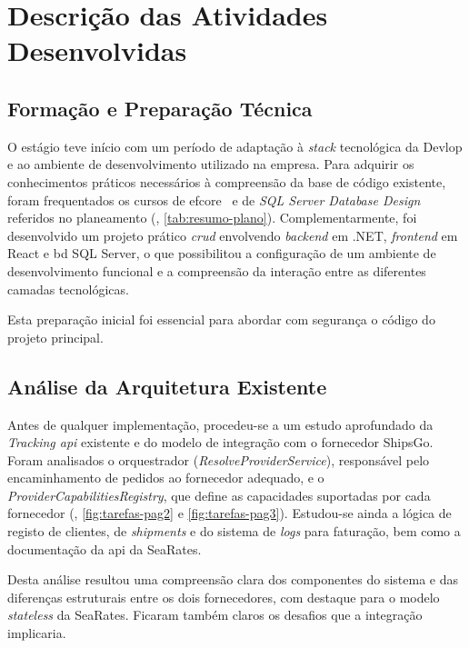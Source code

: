 ﻿%
\chapter{Descrição das Atividades Desenvolvidas}\label{chap:descricao}

\section{Formação e Preparação Técnica}

O estágio teve início com um período de adaptação à \textit{stack} tecnológica da Devlop e ao ambiente de desenvolvimento utilizado na empresa. Para adquirir os conhecimentos práticos necessários à compreensão da base de código existente, foram frequentados os cursos de \gls{efcore}~\cite{efcore-course} e de \textit{SQL Server Database Design}~\cite{sqlserver-course} referidos no planeamento (, \autoref{tab:resumo-plano}). Complementarmente, foi desenvolvido um projeto prático \textit{\gls{crud}} envolvendo \textit{backend} em .NET, \textit{frontend} em React e \gls{bd} SQL Server, o que possibilitou a configuração de um ambiente de desenvolvimento funcional e a compreensão da interação entre as diferentes camadas tecnológicas.

Esta preparação inicial foi essencial para abordar com segurança o código do projeto principal.

\section{Análise da Arquitetura Existente}

Antes de qualquer implementação, procedeu-se a um estudo aprofundado da \textit{Tracking \gls{api}} existente e do modelo de integração com o fornecedor ShipsGo. Foram analisados o orquestrador (\textit{ResolveProviderService}), responsável pelo encaminhamento de pedidos ao fornecedor adequado, e o \textit{ProviderCapabilitiesRegistry}, que define as capacidades suportadas por cada fornecedor (, \autoref{fig:tarefas-pag2} e \autoref{fig:tarefas-pag3}). Estudou-se ainda a lógica de registo de clientes, de \textit{shipments} e do sistema de \textit{logs} para faturação, bem como a documentação da \gls{api} da SeaRates.

Desta análise resultou uma compreensão clara dos componentes do sistema e das diferenças estruturais entre os dois fornecedores, com destaque para o modelo \textit{stateless} da SeaRates. Ficaram também claros os desafios que a integração implicaria.

